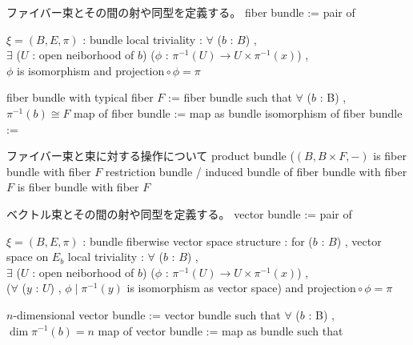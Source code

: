 \begin{Definition}
\itemnote
  ファイバー束とその間の射や同型を定義する。
\itemdefi
  fiber bundle := pair of
  \begin{itemize}
    \itemenum \(\xi = (B , E , \pi)\) : bundle
    \itemwith local triviality :
      \(\forall\) (\(b\) : \(B\)) , \\
      \(\exists\) (\(U\) : open neiborhood of \(b\)) (\(\phi\) : \(\pi^{-1}(U) \to U \times \pi^{-1}(x)\)) , \\
      \(\phi\) is isomorphism and \(\text{projection} \circ \phi = \pi\)
  \end{itemize}
\itemdefi
  fiber bundle with typical fiber \(F\) :=
  fiber bundle such that \(\forall\) (\(b\) : B) , \(\pi^{-1}(b) \cong F\)
\itemdefi
  map of fiber bundle := map as bundle
\itemdefi
  isomorphism of fiber bundle := 
\end{Definition}

\begin{Theorem}
\itemnote
  ファイバー束と束に対する操作について
\itemprop
  product bundle (\((B , B \times F , -)\) is fiber bundle with fiber \(F\)
\itemprop
  restriction bundle / induced bundle of fiber bundle with fiber \(F\) is fiber bundle with fiber \(F\)
\end{Theorem}

\begin{Proof}
\itemprof
\end{Proof}

\begin{Definition}
\itemnote
  ベクトル束とその間の射や同型を定義する。
\itemdefi
  vector bundle := pair of
  \begin{itemize}
    \itemenum \(\xi = (B , E , \pi)\) : bundle
    \itemenum fiberwise vector space structure :
      for (\(b\) : \(B\)) , vector space on \(E_b\)
    \itemwith local triviality :
      \(\forall\) (\(b\) : \(B\)) , \\
      \(\exists\) (\(U\) : open neiborhood of \(b\)) (\(\phi\) : \(\pi^{-1}(U) \to U \times \pi^{-1}(x)\)) , \\
      (\(\forall\) (\(y\) : \(U\)) , \(\phi \mid \pi^{-1}(y)\) is isomorphism as vector space) and \(\text{projection} \circ \phi = \pi\)
  \end{itemize}
\itemdefi
  \(n\)-dimensional vector bundle :=
  vector bundle such that \(\forall\) (\(b\) : B) , \(\dim \pi^{-1}(b) = n\)
\itemdefi
  map of vector bundle := map as bundle such that 
\end{Definition}


